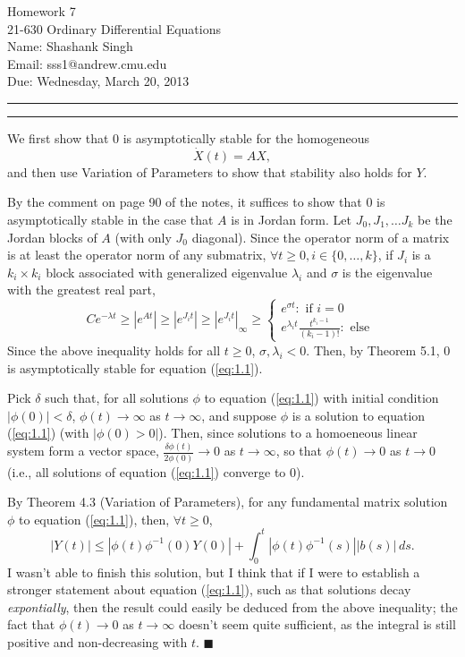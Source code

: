 \documentclass[11pt]{article}
\makeatletter
\newcounter{questionCounter}
\newcounter{partCounter}[questionCounter]
\newenvironment{question}[2][\arabic{questionCounter}]{%
    \setcounter{partCounter}{0}%
    \vspace{.25in} \hrule \vspace{0.5em}%
        \noindent{\bf #2}%
    \vspace{0.8em} \hrule \vspace{.10in}%
    \addtocounter{questionCounter}{1}%
}{}
\newcommand{\myname}{Shashank Singh}
\newcommand{\myandrew}{sss1@andrew.cmu.edu}
\newcommand{\myclass}{21-630 Ordinary Differential Equations}
\newcommand{\myhwnum}{7}
\newcommand{\duedate}{Wednesday, March 20, 2013}
\renewcommand{\qed}{\quad $\blacksquare$}
\newcommand{\inv}{^{-1}}
\makeatother
\begin{document}
\thispagestyle{plain}

{\Large Homework \myhwnum} \\
\myclass \\
Name: \myname \\
Email: \myandrew \\
Due: \duedate

\begin{question}{Problem 1}
We first show that $0$ is asymptotically stable for the homogeneous
\begin{equation}
\dot X(t) = AX,
\label{eq:1.1}
\end{equation}
and then use Variation of Parameters to show that stability also holds for $Y$.

By the comment on page 90 of the notes, it suffices to show that $0$ is
asymptotically stable in the case that $A$ is in Jordan form. Let
$J_0,J_1,\dots J_k$ be the Jordan blocks of $A$ (with only $J_0$ diagonal).
Since the operator norm of a matrix is at least the operator norm of any
submatrix, $\forall t \geq 0, i \in \{0,\dots,k\}$, if $J_i$ is a
$k_i \times k_i$ block associated with generalized eigenvalue $\lambda_i$ and
$\sigma$ is the eigenvalue with the greatest real part,
\[Ce^{-\lambda t}
    \geq \left|e^{At}\right|
    \geq |e^{J_it}|
    \geq |e^{J_it}|_{\infty}
    \geq \left\{
        \begin{array}{cl}
            e^{\sigma t} : \mbox{ if } i = 0 \\
            e^{\lambda_i t} \frac{t^{k_i - 1}}{(k_i - 1)!} : \mbox{ else }
        \end{array}
    \right.
\]
Since the above inequality holds for all $t \geq 0$, $\sigma, \lambda_i < 0$.
Then, by Theorem 5.1, $0$ is asymptotically stable for equation (\ref{eq:1.1}).

Pick $\delta$ such that, for all solutions $\phi$ to equation (\ref{eq:1.1})
with initial condition $|\phi(0)| < \delta$, $\phi(t) \rightarrow \infty$ as
$t \rightarrow \infty$, and suppose $\phi$ is a solution to equation
(\ref{eq:1.1}) (with $|\phi(0) > 0|$). Then, since solutions to a homoeneous
linear system form a vector space,
$\frac{\delta \phi(t)}{2\phi(0)} \rightarrow 0$ as $t \rightarrow \infty$, so
that $\phi(t) \rightarrow 0$ as $t \rightarrow 0$ (i.e., all solutions of
equation (\ref{eq:1.1}) converge to $0$).

By Theorem 4.3 (Variation of Parameters), for any fundamental matrix solution
$\phi$ to equation (\ref{eq:1.1}), then, $\forall t \geq 0$,
\[|Y(t)|
 \leq |\phi(t)\phi\inv(0)Y(0)|
        + \int_0^t |\phi(t)\phi\inv(s)||b(s)| \, ds.
\]
I wasn't able to finish this solution, but I think that if I were to establish
a stronger statement about equation (\ref{eq:1.1}), such as that solutions
decay \emph{expontially}, then the result could easily be deduced from the
above inequality; the fact that $\phi(t) \rightarrow 0$ as
$t \rightarrow \infty$ doesn't seem quite sufficient, as the integral is still
positive and non-decreasing with $t$. \qed
\end{question}
\end{document}
